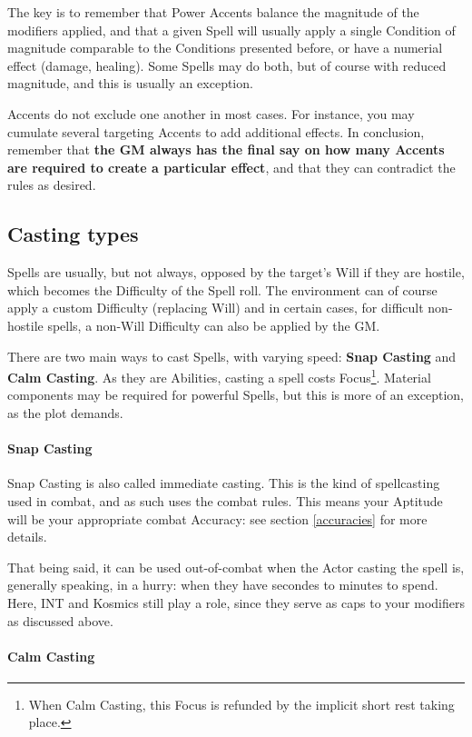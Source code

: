 The key is to remember that Power Accents balance the magnitude of the modifiers applied, and that a given Spell will usually apply a single Condition of magnitude comparable to the Conditions presented before, or have a numerial effect (damage, healing). Some Spells may do both, but of course with reduced magnitude, and this is usually an exception.

Accents do not exclude one another in most cases. For instance, you may cumulate several targeting Accents to add additional effects. In conclusion, remember that \textbf{the GM always has the final say on how many Accents are required to create a particular effect}, and that they can contradict the rules as desired.


\subsection{Casting types}
\label{casting_types}

Spells are usually, but not always, opposed by the target's Will if they are hostile, which becomes the Difficulty of the Spell roll. The environment can of course apply a custom Difficulty (replacing Will) and in certain cases, for difficult non-hostile spells, a non-Will Difficulty can also be applied by the GM.

There are two main ways to cast Spells, with varying speed: \textbf{Snap Casting} and \textbf{Calm Casting}. As they are Abilities, casting a spell costs Focus\footnote{When Calm Casting, this Focus is refunded by the implicit short rest taking place.}. Material components may be required for powerful Spells, but this is more of an exception, as the plot demands.

\paragraph{Snap Casting}

Snap Casting is also called immediate casting. This is the kind of spellcasting used in combat, and as such uses the combat rules. This means your Aptitude will be your appropriate combat Accuracy: see section \ref{accuracies} for more details. 

That being said, it can be used out-of-combat when the Actor casting the spell is, generally speaking, in a hurry: when they have secondes to minutes to spend. Here, INT and Kosmics still play a role, since they serve as caps to your modifiers as discussed above.

\paragraph{Calm Casting}

